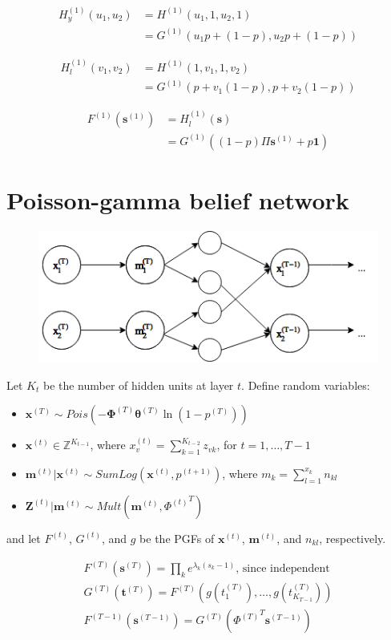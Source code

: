 \documentclass{article}
\begin{document}
\begin{align*}
H_y^{(1)}(u_1, u_2) &= H^{(1)}(u_1, 1, u_2, 1) \\
&= G^{(1)}(u_1p + (1-p), u_2p + (1-p))
\end{align*}

\begin{align*}
H_l^{(1)}(v_1, v_2) &= H^{(1)}(1, v_1, 1, v_2) \\
&= G^{(1)}(p + v_1(1-p), p + v_2(1-p))
\end{align*}

\begin{align*}
F^{(1)}(\mathbf{s}^{(1)}) &= H_l^{(1)}(\mathbf{s}) \\
&= G^{(1)}((1-p)\Pi \mathbf{s}^{(1)} + p \mathbf{1})
\end{align*}

\section{Poisson-gamma belief network}
\begin{figure}[h]
\includegraphics[width=\textwidth]{pgbn}
\end{figure}

Let $K_t$ be the number of hidden units at layer $t$. Define random variables:
\begin{itemize}
\item $\mathbf{x}^{(T)} \sim Pois(-\mathbf{\Phi}^{(T)} \boldsymbol{\theta}^{(T)} \ln (1 - p^{(T)}))$
\item $\mathbf{x}^{(t)} \in \mathbb{Z}^{K_{t-1}}$, where $x_v^{(t)} = \sum_{k=1}^{K_{t-2}} z_{vk}$, for $t = 1, \ldots, T-1$
\item $\mathbf{m}^{(t)}|\mathbf{x}^{(t)} \sim SumLog(\mathbf{x}^{(t)}, p^{(t+1)})$, where $m_k = \sum_{l=1}^{x_k} n_{kl}$
\item $\mathbf{Z}^{(t)}|\mathbf{m}^{(t)} \sim Mult(\mathbf{m}^{(t)}, {\Phi^{(t)}}^T)$
\end{itemize}
and let $F^{(t)}$, $G^{(t)}$, and $g$ be the PGFs of $\mathbf{x}^{(t)}$, $\mathbf{m}^{(t)}$, and $n_{kl}$, respectively.

\begin{align*}
F^{(T)}(\mathbf{s}^{(T)}) = \prod_k e^{\lambda_k(s_k-1)} \text{, since independent} \\
G^{(T)}(\mathbf{t}^{(T)}) = F^{(T)}(g(t_1^{(T)}), \ldots, g(t_{K_{T-1}}^{(T)})) \\
F^{(T-1)}(\mathbf{s}^{(T-1)}) = G^{(T)}({\Phi^{(T)}}^T \mathbf{s}^{(T-1)})
\end{align*}
\end{document}
